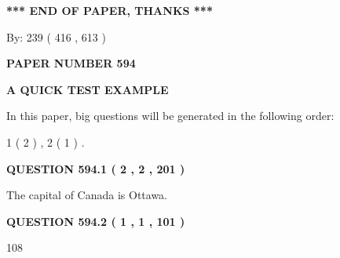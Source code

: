 \documentclass[12pt]{article}
\begin{document}
   
   
   
   
\vspace{1.0in} 
{\textbf{\large{ *** END OF PAPER, THANKS *** }}} 
   
   
\hspace{1.0in} By: 
 239 ( 416 ,  613 )
   
   
   
   
\newpage 
\setcounter{page}{ 
   594001 } 
   
   
   
   
 {\textbf{ \Large{ PAPER NUMBER  594  }}}
   
   
\vspace{0.2in}
   
   
   
   
   
   
 \vspace{0.2in}
{\LARGE {\textbf{ A QUICK TEST EXAMPLE}}}
   
   
   
\vspace{0.2in}
   
In this paper, big questions will be generated in the following order: 
   
   
   1 ( 2 )
 ,
   2 ( 1 )
 .
  
\vspace{0.2in}
  
{\textbf{\Large{QUESTION
594.1 
 ( 2 , 2 , 201 )
}}}
  
  
 
 
\noindent{}
 
 
The capital of Canada is Ottawa.
 
 
 
 
  
\vspace{0.2in}
  
{\textbf{\Large{QUESTION
594.2 
 ( 1 , 1 , 101 )
}}}
  
  
 
 
\noindent{}

108
 
 
 
 
\noindent{}
\end{document}

